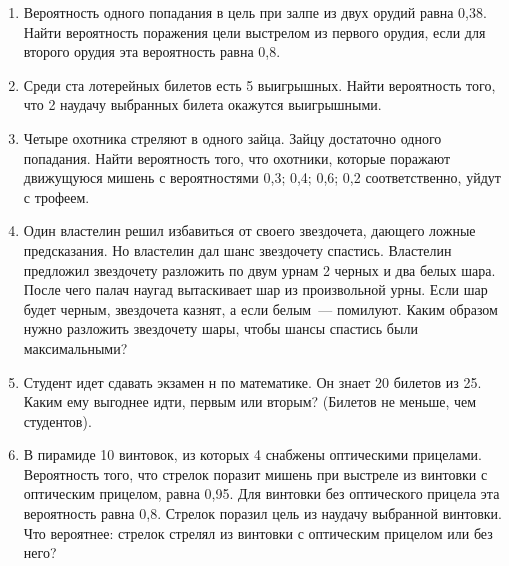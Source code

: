 \documentclass[a4paper,14pt]{extarticle}
\begin{document}
\begin{enumerate}
\item
Вероятность одного попадания в цель при залпе из двух орудий равна 0,38.
Найти вероятность поражения цели выстрелом из первого орудия, если для
второго орудия эта вероятность равна 0,8.
\item
Среди ста лотерейных билетов есть 5 выигрышных. Найти вероятность того,
что 2 наудачу выбранных билета окажутся выигрышными.
\item
Четыре охотника стреляют в одного зайца. Зайцу достаточно одного попадания. Найти вероятность
того, что охотники, которые поражают движущуюся мишень с  вероятностями 0,3; 0,4; 0,6; 0,2 соответственно,
уйдут с трофеем.
\item 
Один властелин решил избавиться от своего звездочета, дающего ложные предсказания. Но властелин дал шанс звездочету спастись. Властелин предложил звездочету разложить по двум урнам 2 черных и два белых шара. После чего палач наугад вытаскивает шар из произвольной урны. Если шар будет черным, звездочета казнят, а если белым~--- помилуют. Каким образом нужно разложить звездочету шары, чтобы шансы спастись были максимальными?
\item
Студент идет сдавать экзамен н по математике. Он знает 20 билетов из 25. Каким ему выгоднее идти, первым или вторым? (Билетов не меньше, чем студентов).

\item
В пирамиде 10 винтовок, из которых 4 снабжены оптическими прицелами.
Вероятность того, что стрелок поразит мишень при выстреле из винтовки с
оптическим прицелом, равна 0,95. Для винтовки без оптического прицела
эта вероятность равна 0,8. Стрелок поразил цель из наудачу выбранной
винтовки. Что вероятнее: стрелок стрелял из винтовки с оптическим
прицелом или без него?


\end{enumerate}
\end{document}
